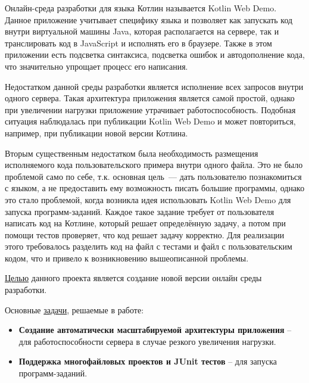 	Онлайн-среда разработки для языка Котлин называется Kotlin Web Demo. Данное приложение учитывает специфику  языка и позволяет как запускать код внутри виртуальной машины Java, которая располагается на сервере, так и транслировать код в JavaScript и исполнять его в браузере. Также в этом приложении есть подсветка синтаксиса, подсветка ошибок и автодополнение кода, что значительно упрощает процесс его написания.
	
	Недостатком данной среды разработки является исполнение всех запросов внутри одного сервера. Такая архитектура приложения является самой простой, однако при увеличении нагрузки приложение утрачивает работоспособность. Подобная ситуация наблюдалась при публикации Kotlin Web Demo и может повториться, например, при публикации новой версии Котлина.
	
	
	Вторым существенным недостатком была необходимость размещения  исполняемого кода  пользовательского примера внутри одного файла. Это не было проблемой само по себе, т.к. основная цель~--- дать пользователю познакомиться с языком, а не предоставить ему возможность писать большие программы, однако это стало проблемой, когда возникла идея использовать Kotlin Web Demo для запуска программ-заданий. Каждое такое задание требует от пользователя написать код на Котлине, который решает определённую задачу, а потом при помощи тестов проверяет, что код решает задачу корректно. Для реализации этого требовалось разделить код на файл с тестами и файл с пользовательским кодом, что и привело к возникновению вышеописанной проблемы.
	
	
	\underline{Целью} данного проекта является создание новой версии онлайн среды разработки.
	
	Основные \underline{задачи}, решаемые в работе:
	\begin{itemize}
		\item { \bf Создание автоматически масштабируемой архитектуры приложения} -- для работоспособности сервера в случае резкого увеличения нагрузки.
		\item { \bf Поддержка многофайловых проектов и JUnit тестов} -- для запуска программ-заданий.
	\end{itemize}
		


